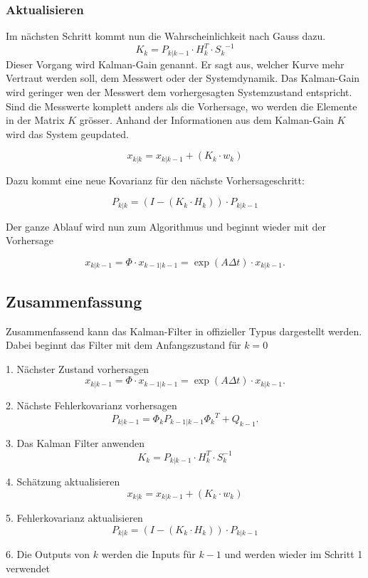 \subsubsection*{Aktualisieren}
Im nächsten Schritt kommt nun die Wahrscheinlichkeit nach Gauss dazu. 
\[ 
{K_{k}}= {{P_{k|k-1}} \cdot {H_{k}^T}}\cdot {S_{k}}^{-1} 
 \] 
Dieser Vorgang wird Kalman-Gain genannt. 
Er sagt aus, welcher Kurve mehr Vertraut werden soll, dem Messwert oder der Systemdynamik.
Das Kalman-Gain wird geringer wen der Messwert dem vorhergesagten Systemzustand entspricht. 
Sind die Messwerte komplett anders als die Vorhersage, wo werden die Elemente in der Matrix $K$ grösser.
Anhand der Informationen aus dem Kalman-Gain $K$ wird das System geupdated.

\[ 
{x_{k|k}}={x_{k|k-1}}+({K_{k}}\cdot {w_{k}}) 
 \] 

Dazu kommt  eine neue Kovarianz für den nächste Vorhersageschritt:

\[ 
{P_{k|k}}=(I-({K_{k}} \cdot {H_{k}})) \cdot {P_{k|k-1}}  
 \] 

Der ganze Ablauf wird nun zum Algorithmus und beginnt wieder mit der Vorhersage 

\[ 
{x_{k|k-1}}=\Phi \cdot {x_{k-1|k-1}}= \exp(A\Delta t)\cdot{x_{k|k-1}}.
 \] 


\subsection{Zusammenfassung }
Zusammenfassend kann das Kalman-Filter in offizieller Typus dargestellt werden. 
Dabei beginnt das Filter mit dem Anfangszustand für $k=0$

1. Nächster Zustand vorhersagen
\[{x_{k|k-1}}=\Phi \cdot {x_{k-1|k-1}}= \exp(A\Delta t)\cdot{x_{k|k-1}}.\] 

2. Nächste Fehlerkovarianz vorhersagen
\[{P_{k|k-1}}={\Phi _{k}} {P_{k-1|k-1}} {\Phi _{k}}^T + {Q_{k-1}}.\] 

3. Das Kalman Filter anwenden
\[{K_{k}}= {P_{k|k-1}} \cdot {H_{k}^T}\cdot {S_{k}^{-1}}\] 

4. Schätzung aktualisieren
\[{x_{k|k}}={x_{k|k-1}}+({K_{k}}\cdot {w_{k}}) \] 

5. Fehlerkovarianz aktualisieren
\[{P_{k|k}}=(I-({K_{k}}\cdot {H_{k}})) \cdot {P_{k|k-1}} \] 


6. Die Outputs von $k$ werden die Inputs für ${k-1}$ und werden wieder im Schritt 1 verwendet

